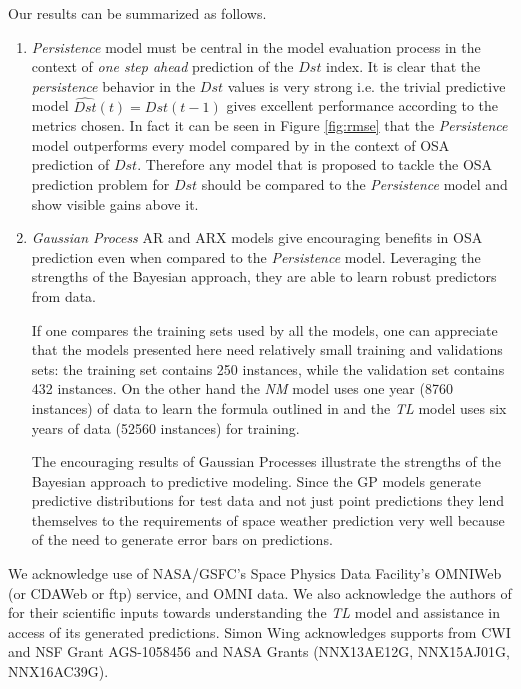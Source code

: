 \documentclass[referee,a4paper,12pt,traditabstract]{swsc}
\begin{document}
\begin{linenumbers}
Our results can be summarized as follows.
   \begin{enumerate}
      \item \emph{Persistence} model must be central in the model evaluation process in the context of \emph{one step ahead} prediction of the $Dst$ index. It is clear that the \emph{persistence} behavior in the $Dst$ values is very strong i.e. the trivial predictive model $\hat{Dst}(t) = Dst(t-1)$ gives excellent performance according to the metrics chosen. In fact it can be seen in Figure \ref{fig:rmse} that the \emph{Persistence} model outperforms every model compared by \citet{Ji2012} in the context of OSA prediction of $Dst$. Therefore any model that is proposed to tackle the OSA prediction problem for $Dst$ should be compared to the \emph{Persistence} model and show visible gains above it.
      
      \item \emph{Gaussian Process} AR and ARX models give encouraging benefits in OSA prediction even when compared to the \emph{Persistence} model. Leveraging the strengths of the Bayesian approach, they are able to learn robust predictors from data. 
      
      If one compares the training sets used by all the models, one can appreciate that the models presented here need relatively small training and validations sets: the training set contains 250 instances, while the validation set contains 432 instances. On the other hand the \emph{NM} model uses one year (8760 instances) of data to learn the formula outlined in \citet{balikhin:narmax} and the \emph{TL} model uses six years of data (52560 instances) for training. 
      
      The encouraging results of Gaussian Processes illustrate the strengths of the Bayesian approach to predictive modeling. Since the GP models generate predictive distributions for test data and not just point predictions they lend themselves to the requirements of space weather prediction very well because of the need to generate error bars on predictions.
   \end{enumerate}
   

\begin{acknowledgements}
      We acknowledge use of NASA/GSFC's Space Physics Data Facility's OMNIWeb (or CDAWeb or ftp) service, and OMNI data. We also acknowledge the authors of \citet{JGRA:JGRA16300} for their scientific inputs towards understanding the \emph{TL} model and assistance in access of its generated predictions. Simon Wing acknowledges supports from CWI and NSF Grant AGS-1058456 and NASA Grants (NNX13AE12G, NNX15AJ01G, NNX16AC39G).   
\end{acknowledgements}


\end{linenumbers}
\end{document}
